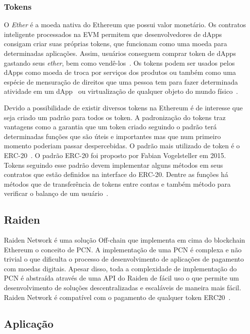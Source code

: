 \documentclass[12pt]{article}
\begin{document}
\subsubsection{Tokens}

O \emph{Ether} é a moeda nativa do Ethereum que possui valor monetário. Os contratos inteligente processados na EVM permitem que desenvolvedores de dApps consigam criar suas próprias tokens, que funcionam como uma moeda para determinadas aplicações. Assim, usuários conseguem comprar token de dApps gastando seus \emph{ether}, bem como vendê-los~\cite{veronica2019token}. Os tokens podem ser usados pelos dApps como moeda de troca por serviços dos produtos ou também como uma espécie de mensuração de direitos que uma pessoa tem para fazer determinada atividade em um dApp~\cite{arum2019token} ou virtualização de qualquer objeto do mundo físico~\cite{ethereum2021oficial}.

Devido a possibilidade de existir diversos tokens na Ethereum é de interesse que seja criado um padrão para todos os token. A padronização do tokens traz vantagens como a garantia que um token criado seguindo o padrão terá determinadas funções que são úteis e importantes mas que num primeiro momento poderiam passar despercebidas. O padrão mais utilizado de token é o ERC-20~\cite{ethereum2021oficial}. O padrão ERC-20 foi proposto por Fabian Vogelsteller em 2015. Tokens seguindo esse padrão devem implementar alguns métodos em seus contratos que estão definidos na interface do ERC-20. Dentre as funções há métodos que de transferência de tokens entre contas e também método para verificar o balanço de um usuário~\cite{ethereum2021oficial}.

\subsection{Raiden}
     
 Raiden Network é uma solução Off-chain que implementa em cima do blockchain Ethereum o conceito de PCN. A implementação de uma PCN é complexa e não trivial o que dificulta o processo de desenvolvimento de aplicações de pagamento com moedas digitais. Apesar disso, toda a complexidade de implementação do PCN é abstraída através de uma API do Raiden de fácil uso o que permite um desenvolvimento de soluções descentralizadas e escaláveis de maneira mais fácil. Raiden Network é compatível com o pagamento de qualquer token ERC20~\cite{raidenmedium}.
     

\subsection{Aplicação}
\end{document}
